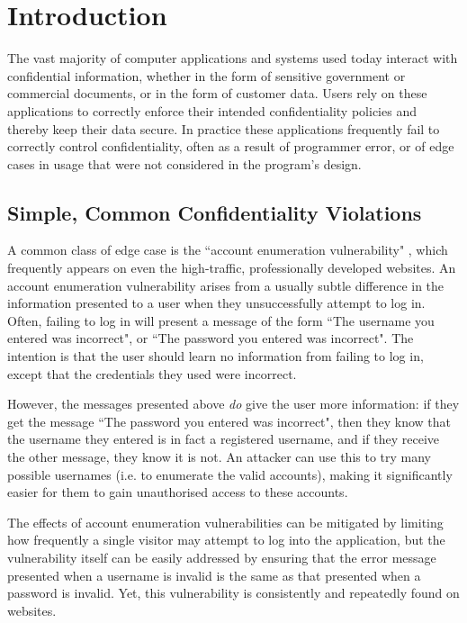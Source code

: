 \chapter{Introduction}

The vast majority of computer applications and systems used today interact with confidential information, whether in the form of sensitive government or commercial documents, or in the form of customer data. Users rely on these applications to correctly enforce their intended confidentiality policies and thereby keep their data secure. In practice these applications frequently fail to correctly control confidentiality, often as a result of programmer error, or of edge cases in usage that were not considered in the program's design.

\newpage

\section{Simple, Common Confidentiality Violations}

A common class of edge case is the ``account enumeration vulnerability" \cite{accountenumeration}, which frequently appears on even the high-traffic, professionally developed websites. An account enumeration vulnerability arises from a usually subtle difference in the information presented to a user when they unsuccessfully attempt to log in. Often, failing to log in will present a message of the form ``The username you entered was incorrect", or ``The password you entered was incorrect". The intention is that the user should learn no information from failing to log in, except that the credentials they used were incorrect.

However, the messages presented above \textit{do} give the user more information: if they get the message ``The password you entered was incorrect", then they know that the username they entered is in fact a registered username, and if they receive the other message, they know it is not. An attacker can use this to try many possible usernames (i.e. to enumerate the valid accounts), making it significantly easier for them to gain unauthorised access to these accounts.

The effects of account enumeration vulnerabilities can be mitigated by limiting how frequently a single visitor may attempt to log into the application, but the vulnerability itself can be easily addressed by ensuring that the error message presented when a username is invalid is the same as that presented when a password is invalid. Yet, this vulnerability is consistently and repeatedly found on websites.


